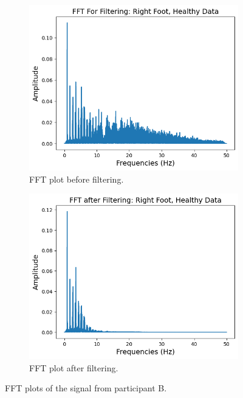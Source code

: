 \begin{figure}[H]
	\centering
	\begin{subfigure}{\linewidth}
		\centering
		\includegraphics[width=\linewidth]{Figures/fft_plot.png}
		\caption{FFT plot before filtering.}
		\label{fig:fft_plot_before}
	\end{subfigure}\vfill
	\begin{subfigure}{\linewidth}
		\centering
		\includegraphics[width=\linewidth]{Figures/fft_after_filter_plot.png}
		\caption{FFT plot after filtering.}
		\label{fig:fft_plot_after}
	\end{subfigure}
	\caption{FFT plots of the signal from participant B.}
	\label{fig:fft_plot}
\end{figure}

